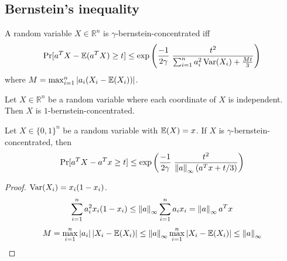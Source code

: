 \subsection{Bernstein's inequality}

\begin{definition}
A random variable $X \in \mathbb{R}^n$ is $\gamma$-bernstein-concentrated iff
\[ \Pr[a^TX - \operatorname{\mathbb{E}}(a^TX) \ge t]
\le \exp\left( \frac{-1}{2\gamma} \; \frac{t^2}{\sum_{i=1}^n a_i^2 \operatorname*{Var}(X_i) + \frac{Mt}{3}} \right) \]
where $M = \max_{i=1}^n \left\lvert a_i(X_i - \operatorname{\mathbb{E}}(X_i)) \right\rvert$.
\end{definition}

\begin{theorem}
Let $X \in \mathbb{R}^n$ be a random variable where each coordinate of $X$ is independent.
Then $X$ is $1$-bernstein-concentrated.
\end{theorem}

\begin{lemma}
\label{thm:refined-bern-conc}
Let $X \in \{0, 1\}^n$ be a random variable with $\operatorname{\mathbb{E}}(X) = x$.
If $X$ is $\gamma$-bernstein-concentrated, then
\[ \Pr[a^TX - a^Tx \ge t]
\le \exp\left( \frac{-1}{2\gamma} \; \frac{t^2}{\left\lVert a \right\rVert_{\infty}(a^Tx + t/3)} \right) \]
\end{lemma}
\begin{proof}
$\operatorname*{Var}(X_i) = x_i(1-x_i)$.
\[ \sum_{i=1}^n a_i^2 x_i(1-x_i)
\le \left\lVert a \right\rVert_{\infty} \sum_{i=1}^n a_ix_i
= \left\lVert a \right\rVert_{\infty} a^Tx \]
\[ M = \max_{i=1}^n \left\lvert a_i \right\rvert\left\lvert X_i - \operatorname{\mathbb{E}}(X_i) \right\rvert
\le \left\lVert a \right\rVert_{\infty} \max_{i=1}^n \left\lvert X_i - \operatorname{\mathbb{E}}(X_i) \right\rvert
\le \left\lVert a \right\rVert_{\infty} \]
\end{proof}


